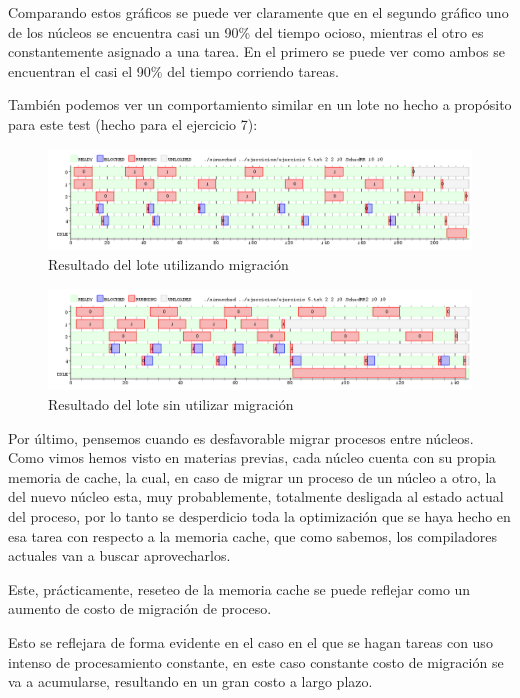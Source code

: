 \documentclass{article}
\begin{document}
Comparando estos gráficos se puede ver claramente que en el segundo gráfico uno de los núcleos se encuentra casi un 90\% del tiempo ocioso, mientras el otro es constantemente asignado a una tarea. En el primero se puede ver como ambos se encuentran el casi el 90\% del tiempo corriendo tareas. 

También podemos ver un comportamiento similar en un lote no hecho a propósito para este test (hecho para el ejercicio 7):

\begin{figure}[h!]
\caption{Resultado del lote utilizando migración \label{grf:ex8-1bm}}
\centering
\includegraphics[width=15cm]{../ejercicios/ejercicio 8-1bRR}
\end{figure}

\begin{figure}[h!]
\caption{Resultado del lote sin utilizar migración \label{grf:ex8-1b}}
\centering
\includegraphics[width=15cm]{../ejercicios/ejercicio 8-1b}
\end{figure}

Por último, pensemos cuando es desfavorable migrar procesos entre núcleos. Como vimos hemos visto en materias previas, cada núcleo cuenta con su propia memoria de cache, la cual, en caso de migrar un proceso de un núcleo a otro, la del nuevo núcleo esta, muy probablemente, totalmente desligada al estado actual del proceso, por lo tanto se desperdicio toda la optimización que se haya hecho en esa tarea con respecto a la memoria cache, que como sabemos, los compiladores actuales van a buscar aprovecharlos.\par
Este, prácticamente, reseteo de la memoria cache se puede reflejar como un aumento de costo de migración de proceso.

Esto se reflejara de forma evidente en el caso en el que se hagan tareas con uso intenso de procesamiento constante, en este caso constante costo de migración se va a acumularse, resultando en un gran costo a largo plazo.
\end{document}
